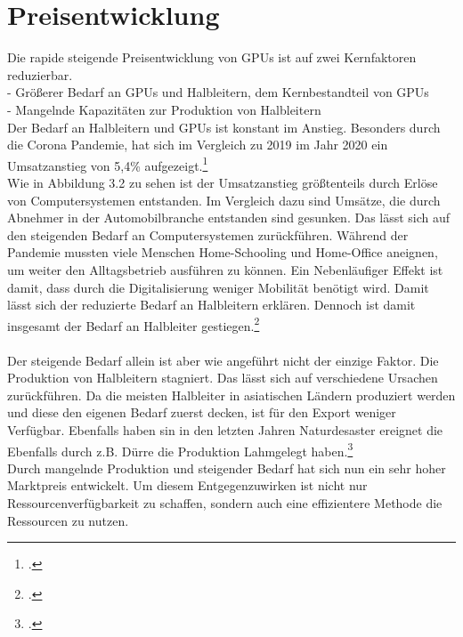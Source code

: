 \documentclass[12pt,toc=bib,toc=listof]{scrreprt}
\begin{document}
\section{Preisentwicklung}
\label{sec:Preisentwicklung}

Die rapide steigende Preisentwicklung von GPUs ist auf zwei Kernfaktoren reduzierbar.\\
- Größerer Bedarf an GPUs und Halbleitern, dem Kernbestandteil von GPUs\\ %
- Mangelnde Kapazitäten zur Produktion von Halbleitern\\
Der Bedarf an Halbleitern und GPUs ist konstant im Anstieg. Besonders durch die Corona Pandemie,
hat sich im Vergleich zu 2019 im Jahr 2020 ein Umsatzanstieg von 5,4\% aufgezeigt.\footcite [Vgl.] []{Voas.2021}
\\Wie in Abbildung 3.2 zu sehen ist der Umsatzanstieg größtenteils durch Erlöse von Computersystemen entstanden.
Im Vergleich dazu sind Umsätze, die durch Abnehmer in der Automobilbranche entstanden sind gesunken.
Das lässt sich auf den steigenden Bedarf an Computersystemen zurückführen. Während der Pandemie mussten
viele Menschen Home-Schooling und Home-Office aneignen, um weiter den Alltagsbetrieb ausführen zu können.
Ein Nebenläufiger Effekt ist damit, dass durch die Digitalisierung weniger Mobilität benötigt wird.
Damit lässt sich der reduzierte Bedarf an Halbleitern erklären. Dennoch ist damit insgesamt der Bedarf an 
Halbleiter gestiegen.\footcite [Vgl.] []{Voas.2021}
\\\\ Der steigende Bedarf allein ist aber wie angeführt nicht der einzige Faktor. Die Produktion 
von Halbleitern stagniert. Das lässt sich auf verschiedene Ursachen zurückführen. Da die meisten 
Halbleiter in asiatischen Ländern produziert werden und diese den eigenen Bedarf zuerst decken, ist 
für den Export weniger Verfügbar. Ebenfalls haben sin in den letzten Jahren Naturdesaster ereignet die
Ebenfalls durch z.B. Dürre die Produktion Lahmgelegt haben.\footcite [Vgl.] []{Voas.2021}
\\
Durch mangelnde Produktion und steigender Bedarf hat sich nun ein sehr hoher Marktpreis entwickelt. 
Um diesem Entgegenzuwirken ist nicht nur Ressourcenverfügbarkeit zu schaffen, sondern auch eine effizientere Methode
die Ressourcen zu nutzen.
\end{document}
